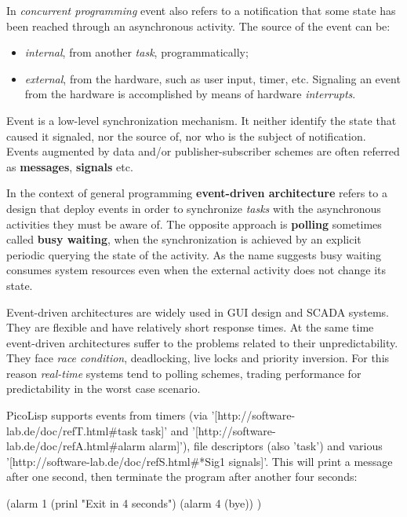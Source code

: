 In \emph{concurrent programming} event also refers to a notification
that some state has been reached through an asynchronous activity. The
source of the event can be:

\begin{itemize}
\item
  \emph{internal}, from another \emph{task},
  programmatically;
\item
  \emph{external}, from the hardware, such as user input, timer, etc.
  Signaling an event from the hardware is accomplished by means of
  hardware \emph{interrupts}.
\end{itemize}

Event is a low-level synchronization mechanism. It neither identify the
state that caused it signaled, nor the source of, nor who is the subject
of notification. Events augmented by data and/or publisher-subscriber
schemes are often referred as \textbf{messages}, \textbf{signals} etc.

In the context of general programming \textbf{event-driven
  architecture} refers to a design that deploy events in order to
synchronize \emph{tasks} with the asynchronous activities they must be
aware of. The opposite approach is \textbf{polling} sometimes called
\textbf{busy waiting}, when the synchronization is achieved by an
explicit periodic querying the state of the activity. As the name
suggests busy waiting consumes system resources even when the external
activity does not change its state.

Event-driven architectures are widely used in GUI design and SCADA
systems. They are flexible and have relatively short response times.
At the same time event-driven architectures suffer to the problems
related to their unpredictability. They face \emph{race condition},
deadlocking, live locks and priority inversion. For this reason
\emph{real-time} systems tend to polling schemes, trading performance
for predictability in the worst case scenario.

\begin{wideverbatim}

PicoLisp supports events from timers (via
'[http://software-lab.de/doc/refT.html#task task]' and
'[http://software-lab.de/doc/refA.html#alarm alarm]'),
file descriptors (also 'task') and various
'[http://software-lab.de/doc/refS.html#*Sig1 signals]'.
This will print a message after one second, then terminate the program after
another four seconds:

(alarm 1
   (prinl "Exit in 4 seconds")
   (alarm 4 (bye)) )

\end{wideverbatim}

